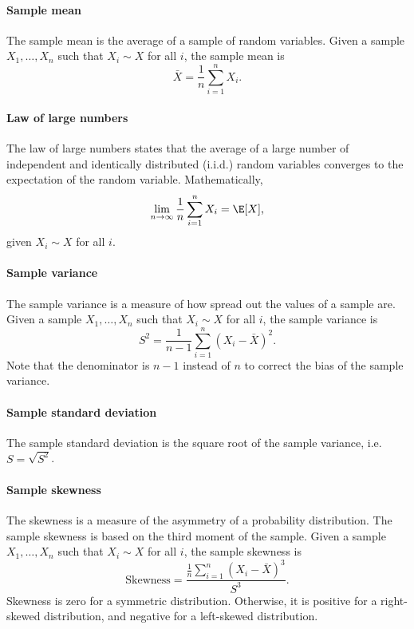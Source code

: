 \paragraph{Sample mean}  The sample mean is the average of a sample of random variables.
Given a sample $X_1, \dots, X_n$ such that $X_i \sim X$ for all $i$, the sample mean is
\begin{equation*}
  \bar{X} = \frac{1}{n} \sum_{i = 1}^n X_i\text{.}
\end{equation*}

\paragraph{Law of large numbers}  The law of large numbers states that the average of
a large number of independent and identically distributed (i.i.d.) random variables converges
to the expectation of the random variable.  Mathematically,
\begin{equation*}
  \lim_{n \rightarrow \infty} \frac{1}{n} \sum_{i = 1}^n X_i = \E[X]\text{,}
\end{equation*}
given $X_i \sim X$ for all $i$.

\paragraph{Sample variance}  The sample variance is a measure of how spread out the
values of a sample are.  Given a sample $X_1, \dots, X_n$ such that $X_i \sim X$ for all
$i$, the sample variance is
\begin{equation*}
  S^2 = \frac{1}{n - 1} \sum_{i = 1}^n (X_i - \bar{X})^2\text{.}
\end{equation*}
Note that the denominator is $n - 1$ instead of $n$ to correct the bias of the sample
variance.

\paragraph{Sample standard deviation}  The sample standard deviation is the square root
of the sample variance, i.e. $S = \sqrt{S^2}$.

\paragraph{Sample skewness}  The skewness is a measure of the asymmetry of a probability
distribution.  The sample skewness is based on the third moment of the sample.  Given a
sample $X_1, \dots, X_n$ such that $X_i \sim X$ for all $i$, the sample skewness is
\begin{equation*}
  \text{Skewness} = \frac{\frac{1}{n} \sum_{i = 1}^n (X_i - \bar{X})^3}{S^3}\text{.}
\end{equation*}
Skewness is zero for a symmetric distribution.  Otherwise, it is positive for a right-skewed distribution,
and negative for a left-skewed distribution.

